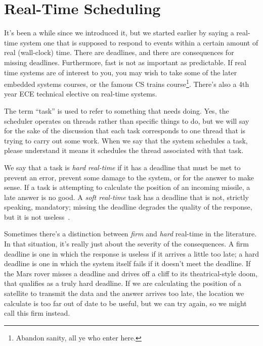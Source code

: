 




\section*{Real-Time Scheduling}
It's been a while since we introduced it, but we started earlier by saying a real-time system one that is supposed to respond to events within a certain amount of real (wall-clock) time. There are deadlines, and there are consequences for missing deadlines. Furthermore, fast is not as important as predictable. If real time systems are of interest to you, you may wish to take some of the later embedded systems courses, or the famous CS trains course\footnote{Abandon sanity, all ye who enter here.}. There's also a 4th year ECE technical elective on real-time systems.

The term ``task'' is used to refer to something that needs doing. Yes, the scheduler operates on threads rather than specific things to do, but we will say for the sake of the discussion that each task corresponds to one thread that is trying to carry out some work. When we say that the system schedules a task, please understand it means it schedules the thread associated with that task.

We say that a task is \textit{hard real-time} if it has a deadline that must be met to prevent an error, prevent some damage to the system, or for the answer to make sense. If a task is attempting to calculate the position of an incoming missile, a late answer is no good. A \textit{soft real-time} task has a deadline that is not, strictly speaking, mandatory; missing the deadline degrades the quality of the response, but it is not useless~\cite{osi}.

Sometimes there's a distinction between \textit{firm} and \textit{hard} real-time in the literature. In that situation, it's really just about the severity of the consequences. A firm deadline is one in which the response is useless if it arrives a little too late; a hard deadline is one in which the system itself fails if it doesn't meet the deadline. If the Mars rover misses a deadline and drives off a cliff to its theatrical-style doom, that qualifies as a truly hard deadline. If we are calculating the position of a satellite to transmit the data and the answer arrives too late, the location we calculate is too far out of date to be useful, but we can try again, so we might call this firm instead.


